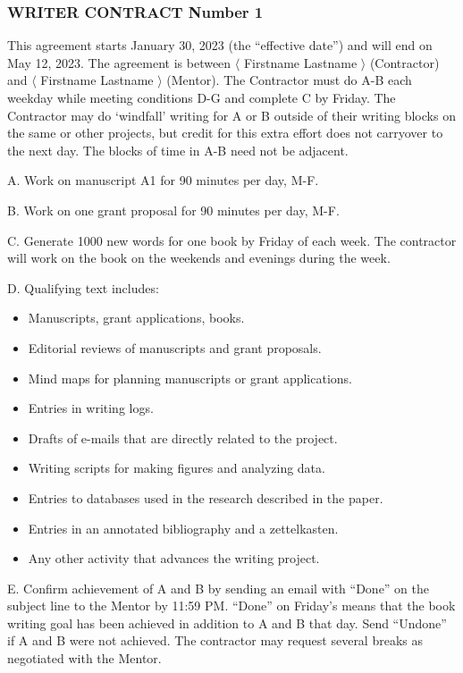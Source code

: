 \documentclass[10pt]{article}
\begin{document}
\thispagestyle{empty}
\subsubsection*{WRITER CONTRACT Number 1}

This agreement starts January 30, 2023 (the “effective date”) and will end on May 12, 2023. 
The agreement is between $\langle$ Firstname Lastname $\rangle$ (Contractor) and $\langle$ Firstname Lastname $\rangle$  (Mentor).
The Contractor must do A-B each weekday while meeting conditions D-G and complete C by Friday.
The Contractor may do `windfall' writing for A or B outside of their writing blocks on the same or other projects, but credit for this extra effort does not carryover to the next day.
The blocks of time in A-B need not be adjacent.

A. Work on manuscript A1 for 90 minutes per day, M-F. 

B. Work on one grant proposal for 90 minutes per day, M-F. 

C. Generate 1000 new words for one book by Friday of each week. 
The contractor will work on the book on the weekends and evenings during the week. 

D. Qualifying text includes: 

\begin{itemize}
\item Manuscripts, grant applications, books.
\item Editorial reviews of manuscripts and grant proposals.
\item Mind maps for planning manuscripts or grant applications.
\item Entries in writing logs.
\item Drafts of e-mails that are directly related to the project.
\item Writing scripts for making figures and analyzing data.
\item Entries to databases used in the research described in the paper.
\item Entries in an annotated bibliography and a zettelkasten.
\item Any other activity that advances the writing project.
\end{itemize}

E. Confirm achievement of A and B by sending an email with ``Done'' on the subject line to the Mentor by 11:59 PM. 
``Done'' on Friday’s means that the book writing goal has been achieved in addition to A and B that day. 
Send ``Undone'' if A and B were not achieved.
The contractor may request several breaks as negotiated with the Mentor.
\end{document}

